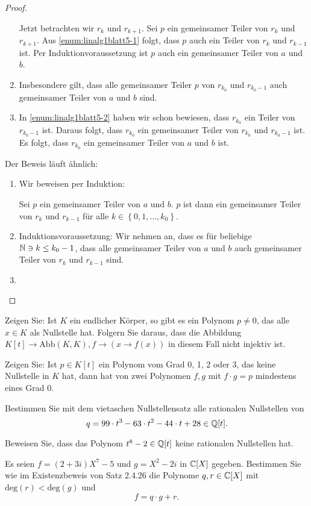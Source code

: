 \begin{proof}
\begin{parts}
\begin{enumerate}[label=(\roman*)]
	Jetzt betrachten wir $r_k$ und $r_{k+1}$. Sei $p$ ein gemeinsamer Teiler von $r_k$ und $r_{k+1}$. Aus \ref{enum:linalg1blatt5-1} folgt, dass $p$ auch ein Teiler von $r_k$ und $r_{k-1}$ ist. Per Induktionvoraussetzung ist $p$ auch ein gemeinsamer Teiler von $a$ und $b$.
\item Insbesondere gilt, dass alle gemeinsamer Teiler $p$ von $r_{k_0}$ und $r_{k_0-1}$ auch gemeinsamer Teiler von $a$ und $b$ sind. 
\item In \ref{enum:linalg1blatt5-2} haben wir schon bewiesen, dass $r_{k_0}$ ein Teiler von $r_{k_0-1}$ ist. Daraus folgt, dass $r_{k_0}$ ein gemeinsamer Teiler von $r_{k_0}$ und $r_{k_0-1}$ ist. Es folgt, dass $r_{k_0}$ ein gemeinsamer Teiler von $a$ und $b$ ist.
\end{enumerate}
\item Der Beweis läuft ähnlich:
\begin{enumerate}[label=(\roman*)]
	\item Wir beweisen per Induktion:
		\begin{tcolorbox}
			Sei $p$ ein gemeinsamer Teiler von $a$ und $b$. $p$ ist dann ein gemeinsamer Teiler von $r_k$ und $r_{k-1}$ f\"{u}r alle $k\in \left\{ 0,1,\dots, k_0 \right\} $.
		\end{tcolorbox}
	\item Induktionsvoraussetzung: Wir nehmen an, dass es f\"{u}r beliebige $\mathbb{N} \ni k \le k_0-1$, dass alle gemeinsamer Teiler von $a$ und $b$ auch gemeinsamer Teiler von $r_{k}$ und $r_{k-1}$ sind.
	\item  
\end{enumerate}
	\end{parts}
\end{proof}
\begin{Problem}
	\begin{parts}
	\item Zeigen Sie: Ist $K$ ein endlicher Körper, so gibt es ein Polynom $p \neq 0$, das alle $x \in K$ als Nullstelle hat. Folgern Sie daraus, dass die Abbildung $K[t] \to \text{Abb}(K, K), f \to (x \to f (x))$ in diesem Fall nicht injektiv ist.
	\item Zeigen Sie: Ist $p \in K[t]$ ein Polynom vom Grad 0, 1, 2 oder 3, das keine Nullstelle in $K$ hat, dann hat von zwei Polynomen $f, g$ mit $f \cdot g = p$ mindestens eines Grad 0.
	\item Bestimmen Sie mit dem vietaschen Nullstellensatz alle rationalen Nullstellen von
		\[
			q=99\cdot t^3-63\cdot t^2-44\cdot t + 28\in \mathbb{Q}[t]
		.\] 
	\item Beweisen Sie, dass das Polynom $t^8-2\in \mathbb{Q}[t]$ keine rationalen Nullstellen hat.
	\item Es seien $f=(2+3i)X^7-5$ und $g=X^2-2i$ in $\mathbb{C}[X]$ gegeben. Bestimmen Sie wie im Existenzbeweis von Satz 2.4.26 die Polynome $q,r\in \mathbb{C}[X]$ mit $\text{deg}(r)<\text{deg}(g)$ und
		\[
		f=q\cdot g+r
		.\] 
	\end{parts}
\end{Problem}
